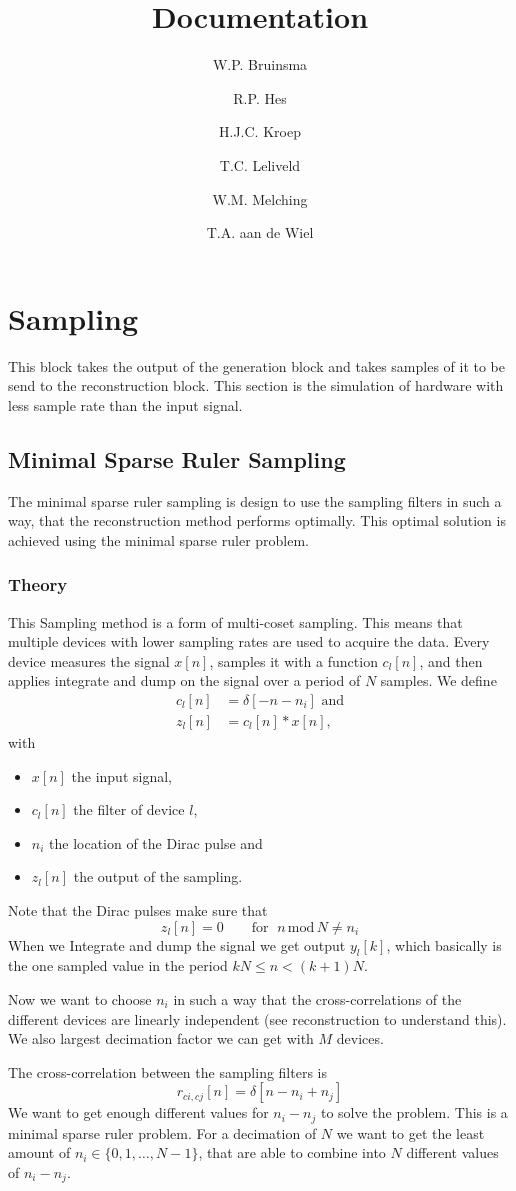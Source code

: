 \documentclass[oneside, a4paper, openany]{memoir}
\title{Documentation}
\author{W.P. Bruinsma \and R.P. Hes \and H.J.C. Kroep \and T.C. Leliveld \and W.M. Melching \and T.A. aan de Wiel}
\begin{document}
\chapter{Sampling}
This block takes the output of the generation block and takes samples of it to be send to the reconstruction block. 
This section is the simulation of hardware with less sample rate than the input signal.


\section{Minimal Sparse Ruler Sampling}
The minimal sparse ruler sampling is design to use the sampling filters in such a way, that the reconstruction method performs optimally. This optimal solution is achieved using the minimal sparse ruler problem.
\subsection{Theory}
This Sampling method is a form of multi-coset sampling. This means that multiple devices with lower sampling rates are used to acquire the data. Every device measures the signal $x[n]$, samples it with a function $c_l[n]$, and then applies integrate and dump on the signal over a period of $N$ samples. We define 
\begin{align}
c_l[n] &= \delta[-n -n_i] \text{ and}\\
z_l[n] &= c_l[n]\ast x[n],
\end{align}
with
\begin{itemize}
\item $x[n]$ the input signal,
\item $c_l[n]$ the filter of device $l$,
\item $n_i$ the location of the Dirac pulse and
\item $z_l[n]$ the output of the sampling.
\end{itemize}
Note that the Dirac pulses make sure that
$$z_l[n]=0 \quad \quad \text{for }\;n\,\text{mod}\,N\neq n_i$$
When we Integrate and dump the signal we get output $y_l[k]$, which basically is the one sampled value in the period $kN\leq n<(k+1)N$.

Now we want to choose $n_i$ in such a way that the cross-correlations of the different devices are linearly independent (see reconstruction to understand this). We also largest decimation factor we can get with $M$ devices.

The cross-correlation between the sampling filters is 
$$
r_{ci,cj}[n] = \delta [n-n_i+n_j]
$$
We want to get enough different values for $n_i-n_j$ to solve the problem. This is a minimal sparse ruler problem. For a decimation of $N$ we want to get the least amount of $n_i \in \{0,1,\dots,N-1\}$, that are able to combine into $N$ different values of $n_i-n_j$. 
\end{document}
